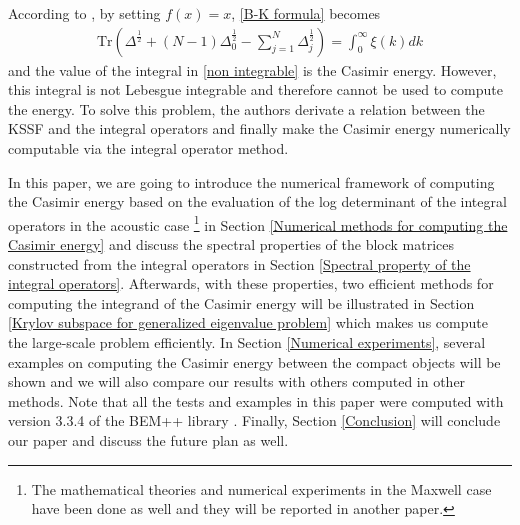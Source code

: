 According to \cite{hanisch2020relative}, by setting $f(x) = x$, \eqref{B-K formula} becomes 
\begin{align}\label{non integrable}
    \text{Tr}\left(\Delta^{\frac{1}{2}} + (N - 1)\Delta_{0}^{\frac{1}{2}} - \sum_{j = 1}^{N}\Delta_{j}^{\frac{1}{2}}\right)  = \int_{0}^{\infty}\xi(k)dk
\end{align}
and the value of the integral in \eqref{non integrable} is the Casimir energy. However, this integral is not Lebesgue integrable and therefore cannot be used 
to compute the energy. To solve this problem, the authors derivate a relation between the KSSF and the integral operators and 
finally make the Casimir energy numerically computable via the integral operator method. 

In this paper, we are going to introduce the numerical framework of computing the Casimir energy based on the evaluation of the log determinant of the integral 
operators in the acoustic case \footnote{The mathematical theories and numerical experiments in the Maxwell case have been done as well and they will be 
reported in another paper.} in Section \ref{Numerical methods for computing the Casimir energy} and discuss the spectral properties 
of the block matrices constructed from the integral operators in Section \ref{Spectral property of the integral operators}. Afterwards, with these properties, 
two efficient methods for computing the integrand of the Casimir energy will be illustrated in Section \ref{Krylov subspace for generalized eigenvalue problem}
which makes us compute the large-scale problem efficiently. In Section \ref{Numerical experiments}, several examples on computing the Casimir energy between 
the compact objects will be shown and we will also compare our results with others computed in other methods. Note that all the tests and examples in this paper were computed 
with version 3.3.4 of the BEM++ library \cite{scroggs2017software}. Finally, Section \ref{Conclusion} will conclude 
our paper and discuss the future plan as well.